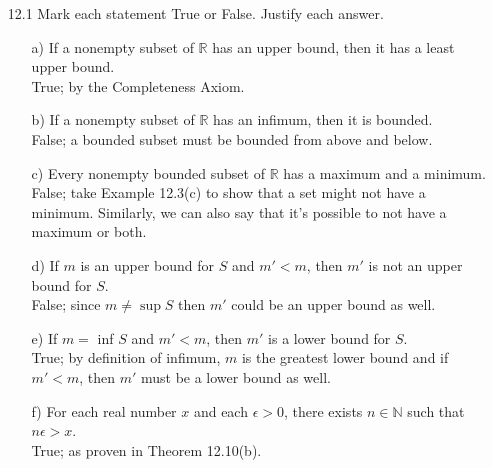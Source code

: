 \documentclass[12pt]{article}
\begin{document}
\begin{enumerate}
\item[12.1] Mark each statement True or False. Justify each answer.
\begin{enumerate}
\item[a)] If a nonempty subset of $\mathbb{R}$ has an upper bound, then it has a least upper bound. \\
True; by the Completeness Axiom.
\item[b)] If a nonempty subset of $\mathbb{R}$ has an infimum, then it is bounded. \\ 
False; a bounded subset must be bounded from above and below.
\item[c)] Every nonempty bounded subset of $\mathbb{R}$ has a maximum and a minimum. \\
False; take Example 12.3(c) to show that a set might not have a minimum. Similarly, we can
also say that it's possible to not have a maximum or both.
\item[d)] If $m$ is an upper bound for $S$ and $m' < m$, then $m'$ is not an upper bound for $S$.\\
False; since $m \neq \sup S$ then $m'$ could be an upper bound as well. 
\item[e)] If $m = $ inf $S$ and $m' < m$, then $m'$ is a lower bound for $S$. \\
True; by definition of infimum, $m$ is the greatest lower bound and if $m' < m$, then $m'$ must
be a lower bound as well.
\item[f)] For each real number $x$ and each $\epsilon > 0$, there exists $n \in \mathbb{N}$ such that $n\epsilon > x$. \\
True; as proven in Theorem 12.10(b).
\end{enumerate}


\end{enumerate}
\end{document}
